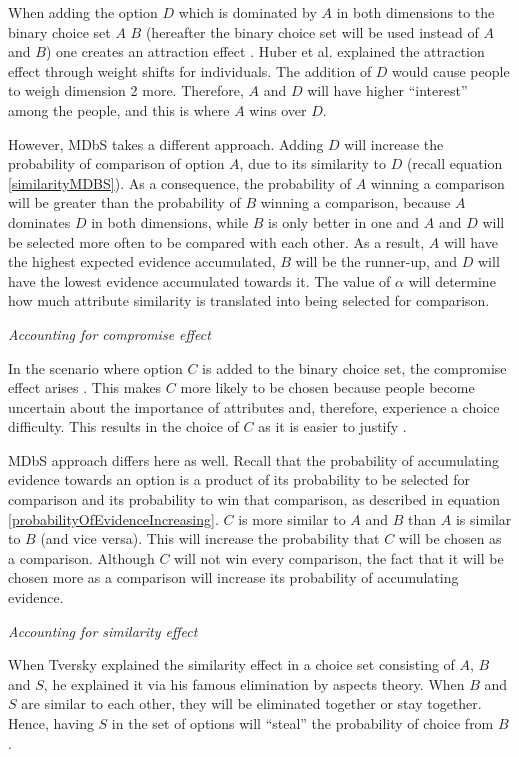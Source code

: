 \documentclass[a4paper,12pt]{article}
\newcommand{\citeyearonly}[1]{\citeyearpar{#1}}
\begin{document}
When adding the option $D$ which is dominated by $A$ in both dimensions to the binary choice set $A$ $B$ (hereafter the binary choice set will be used instead of $A$ and $B$) one creates an attraction effect \citep{huberEtAl82, huberPuto83}. Huber et al. \citeyearonly{huberEtAl82} explained the attraction effect through weight shifts for individuals. The addition of $D$ would cause people to weigh dimension 2 more. Therefore, $A$ and $D$ will have higher ``interest'' among the people, and this is where $A$ wins over $D$.

However, MDbS takes a different approach. Adding $D$ will increase the probability of comparison of option $A$, due to its similarity to $D$ (recall equation \ref{similarityMDBS}). As a consequence, the probability of $A$ winning a comparison will be greater than the probability of $B$ winning a comparison, because $A$ dominates $D$ in both dimensions, while $B$ is only better in one and $A$ and $D$ will be selected more often to be compared with each other. As a result, $A$ will have the highest expected evidence accumulated, $B$ will be the runner-up, and $D$ will have the lowest evidence accumulated towards it. The value of $\alpha$ will determine how much attribute similarity is translated into being selected for comparison.

\textit{Accounting for compromise effect}

In the scenario where option $C$ is added to the binary choice set, the compromise effect arises \citep{simonson89}. This makes $C$ more likely to be chosen because people become uncertain about the importance of attributes and, therefore, experience a choice difficulty. This results in the choice of $C$ as it is easier to justify \citep{simonson89}. 

MDbS approach differs here as well. Recall that the probability of accumulating evidence towards an option is a product of its probability to be selected for comparison and its probability to win that comparison, as described in equation \ref{probabilityOfEvidenceIncreasing}. $C$ is more similar to $A$ and $B$ than $A$ is similar to $B$ (and vice versa). This will increase the probability that $C$ will be chosen as a comparison. Although $C$ will not win every comparison, the fact that it will be chosen more as a comparison will increase its probability of accumulating evidence.

\textit{Accounting for similarity effect}

When Tversky \citeyearonly{tversky1972elimination} explained the similarity effect in a choice set consisting of $A$, $B$ and $S$, he explained it via his famous elimination by aspects theory. When $B$ and $S$ are similar to each other, they will be eliminated together or stay together. Hence, having $S$ in the set of options will ``steal'' the probability of choice from $B$.
\end{document}
